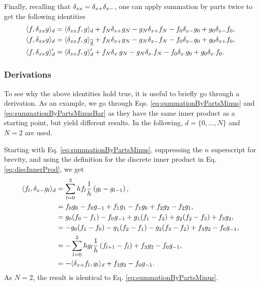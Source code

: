Finally, recalling that $\delta_{xx} = \delta_{x+}\delta_{x-}$, one can apply summation by parts twice to get the following identities
\begin{subequations}
    \begin{align}
        \langle f, \delta_{xx} g\rangle_d &= \langle \delta_{xx}f, g \rangle_d+f_N\delta_{x+}g_N-g_N\delta_{x+}f_N -f_0\delta_{x-}g_0+g_0\delta_{x-}f_0,\label{eq:summationsummationByPartsTwice}\\
        \langle f, \delta_{xx} g\rangle_d &= \langle \delta_{xx}f, g \rangle_{\underline{\overline{d}}}+f_N\delta_{x+} g_N-g_N\delta_{x-} f_N -f_0\delta_{x-} g_0+g_0\delta_{x+} f_0,\label{eq:summationByPartsTwiceReduced}\\
        \langle f, \delta_{xx} g\rangle_d' &= \langle \delta_{xx} f, g\rangle_d' + f_N\delta_{x\cdot} g_N - g_N \delta_{x\cdot} f_N - f_0 \delta_{x\cdot} g_0 + g_0 \delta_{x\cdot} f_0.\label{eq:summationByPartsTwicePrimed}
    \end{align}
\end{subequations}

\subsubsection{Derivations}
To see why the above identities hold true, it is useful to briefly go through a derivation. As an example, we go through Eqs. \eqref{eq:summationByPartsMinus} and \eqref{eq:summationByPartsMinusBar} as they have the same inner product as a starting point, but yield different results. In the following, $d=\{0, \hdots, N\}$ and $N = 2$ are used. 

Starting with Eq. \eqref{eq:summationByPartsMinus}, suppressing the $n$ superscript for brevity, and using the definition for the discrete inner product in Eq. \eqref{eq:discInnerProd}, we get 
\begin{align*}
    \langle f_l, \delta_{x-} g_l \rangle_d &= \sum_{l = 0}^2 h f_l\frac{1}{h}\left(g_l - g_{l-1}\right),\\
    &= f_0g_0 - f_0g_{-1} + f_1g_1 - f_1g_0 + f_2g_2-f_2g_1,\\
    &= g_0(f_0-f_1) - f_0g_{-1} + g_1(f_1-f_2) + g_2(f_2-f_3) + f_3g_2,\\
    &= -g_0(f_1-f_0)- g_1(f_2-f_1) - g_2(f_3-f_2) + f_3g_2 - f_0g_{-1},\\
    &= -\sum_{l=0}^2 h g_l\frac{1}{h}\left(f_{l+1} - f_l\right) + f_3g_2 - f_0g_{-1},\\
    &= -\langle \delta_{x+} f_l, g_l\rangle_d + f_3g_2 - f_0g_{-1}.
\end{align*}
As $N=2$, the result is identical to Eq. \eqref{eq:summationByPartsMinus}. 

